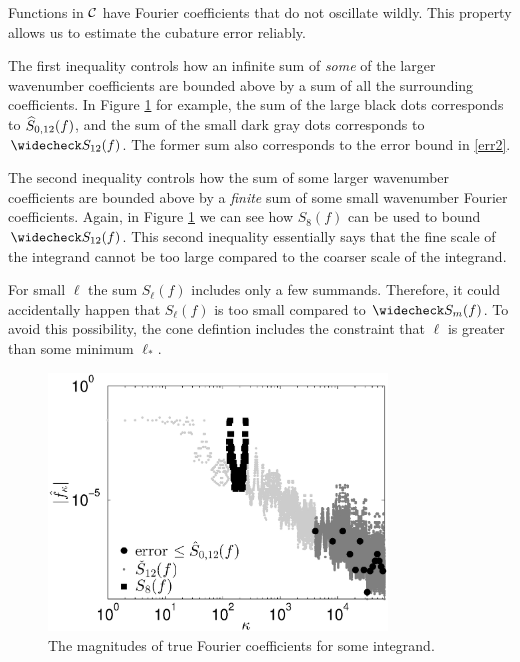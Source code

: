 \documentclass[graybox]{svmult}
\begin{document}
Functions in $\mathcal{C}$ have Fourier coefficients that do not oscillate wildly.  This property allows us to estimate the cubature error reliably. 

The first inequality controls how an infinite sum of \emph{some} of the larger wavenumber coefficients are bounded above by a sum of all the surrounding coefficients.  In Figure \ref{Walshcoeffig} for example, the sum of the large black dots corresponds to $\widehat{S}_{0,12}(f)$, and the sum of the small dark gray dots corresponds to $\wcS_{12}(f)$. The former sum also corresponds to the error bound in \eqref{err2}.

The second inequality controls how the sum of some  larger wavenumber coefficients are bounded above by a \emph{finite} sum of some small wavenumber Fourier coefficients. Again, in Figure \ref{Walshcoeffig} we can see how $S_8(f)$ can be used to bound $\wcS_{12}(f)$. This second inequality essentially says that the fine scale of the integrand cannot be too large compared to the coarser scale of the integrand.

For small $\ell$ the sum $S_\ell(f)$ includes only a few summands. Therefore, it could accidentally happen that $S_\ell(f)$ is too small compared to $\wcS_m(f)$. To avoid this possibility, the cone defintion includes the constraint that $\ell$ is greater than some minimum $\ell_*$.

\begin{figure}
\centering
\includegraphics[width=9cm]{Images/PlotFFTCoefUse256.eps}
\caption{The magnitudes of true Fourier coefficients for some integrand. \label{Walshcoeffig}}
\end{figure}
\end{document}

